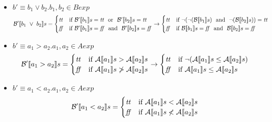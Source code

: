 {\begin{enumerate}[label=(\alph*)]
\begin{itemize}
    \item $ b' \equiv b_1 \lor b_2. b_1, b_2 \in Bexp$ \\
      \begin{align*}  
        \Bext{b_1 \ \lor \ b_2} = 
        \begin{cases} 
        \semtrue & 
        \mbox{if} \ \Bext{b_1} = \semtrue \ \mbox{ or } \ 
              \Bext{b_2} = \semtrue \\ 
        \semfalse & 
        \mbox{if} \ \Bext{b_1} = \semfalse \ \mbox{ and } \ 
              \Bext{b_2} = \semfalse \\ 
        \end{cases} 
        \rightarrow
        \begin{cases} 
        \semtrue & 
        \mbox{if} \ \lnot (\lnot (\B{b_1}) \ \mbox{ and } \ 
              \lnot (\B{b_2})) = \semtrue \\ 
        \semfalse & 
        \mbox{if} \ \B{b_1} = \semfalse \ \mbox{ and } \ 
              \B{b_2} = \semfalse \\ 
        \end{cases}
      \end{align*}
    \item $ b' \equiv a_1 > a_2. a_1, a_2 \in Aexp$ \\
      \begin{align*} 
       \mathcal{B'} \llbracket a_1 > a_2 \rrbracket s = 
        \begin{cases} 
        \mbox{\textit{tt}} & 
        \mbox{if} \ \mathcal{A} \llbracket a_1 \rrbracket s > \mathcal{A} \llbracket a_2 \rrbracket s\\ 
        \mbox{\textit{ff}} & 
        \mbox{if} \ \mathcal{A} \llbracket a_1 \rrbracket s \not > \mathcal{A} \llbracket a_2 \rrbracket s\\
        \end{cases} 
        \rightarrow
        \begin{cases} 
        \mbox{\textit{tt}} & 
        \mbox{if} \ \lnot (\mathcal{A} \llbracket a_1 \rrbracket s \leq \mathcal{A} \llbracket a_2 \rrbracket s)\\ 
        \mbox{\textit{ff}} & 
        \mbox{if} \ \mathcal{A} \llbracket a_1 \rrbracket s \leq \mathcal{A} \llbracket a_2 \rrbracket s\\
        \end{cases} 
      \end{align*}
    \item $ b' \equiv a_1 < a_2. a_1, a_2 \in Aexp$ \\
      \begin{align*}
        \mathcal{B'} \llbracket a_1 < a_2 \rrbracket s = 
        \begin{cases} 
        \mbox{\textit{tt}} & 
        \mbox{if} \ \mathcal{A} \llbracket a_1 \rrbracket s < \mathcal{A} \llbracket a_2 \rrbracket s\\ 
        \mbox{\textit{ff}} & 
        \mbox{if} \ \mathcal{A} \llbracket a_1 \rrbracket s \not < \mathcal{A} \llbracket a_2 \rrbracket s\\

\end{cases}
\end{align*}
\end{itemize}
\end{enumerate}}
